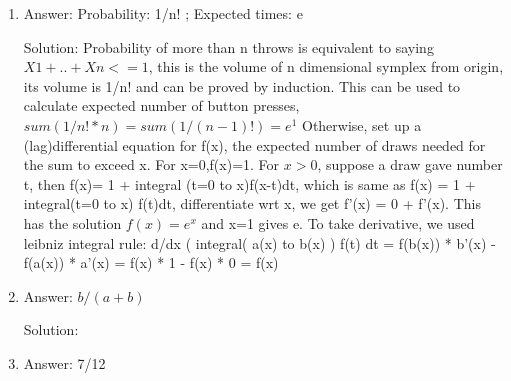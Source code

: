 \begin{enumerate}

\item
Answer: Probability: 1/n! ; Expected times:  e
 
Solution: Probability of more than n throws is equivalent to saying $X1+..+Xn <=1$, this is the volume of n dimensional symplex from origin, its volume is 1/n! and can be proved by induction. This can be used to calculate expected number of button presses, $sum( 1/n! * n ) = sum( 1/(n-1)!) = e^1$
Otherwise, set up a (lag)differential equation for f(x), the expected number of draws needed for the sum to exceed x. For x=0,f(x)=1. For $x>0$, suppose a draw gave number t, then f(x)= 1 + integral (t=0 to x)f(x-t)dt, which is same as f(x) = 1 + integral(t=0 to x) f(t)dt, differentiate wrt x, we get f'(x) = 0 + f'(x). This has the solution $f(x)=e^x$ and x=1 gives e.
To take derivative, we used  leibniz integral rule:
d/dx  ( integral( a(x) to b(x) ) f(t) dt = f(b(x)) * b'(x) - f(a(x)) * a'(x) = f(x) * 1 - f(x) * 0 = f(x)




\item
Answer: $b/(a+b)$
 
Solution: 




\item
Answer: 7/12
 

\end{enumerate}
